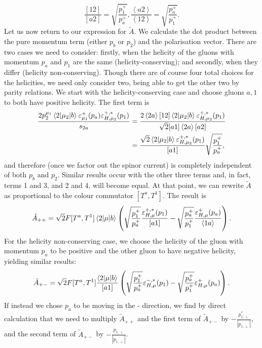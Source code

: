\begin{subequations}
\begin{equation}
\frac{[12]}{[a2]} = \sqrt{\frac{p_1^+}{p_a^+}},
\end{equation}
\begin{equation}
\frac{\left<a2\right>}{\left<12\right>} = \sqrt{\frac{p_a^+}{p_1^+}}.
\end{equation}
\end{subequations}
Let us now return to our expression for $\tilde{A}$. We calculate the dot product between the pure momentum term (either $p_b$ or $p_2$) and the polarisation vector. There are two cases we need to consider: firstly, when the helicity of the gluons with momentum $p_a$ and $p_1$ are the same (helicity-conserving); and secondly, when they differ (helicity non-conserving). Though there are of course four total choices for the helicities, we need only consider two, being able to get the other two by parity relations. We start with the helicity-conserving case and choose gluons $a,1$ to both have positive helicity. The first term is 
\begin{equation}
\begin{split}
 \frac{2 p_2^{\mu_1} \mathinner{\langle2\vert\mu_2\vert b\rangle}_{} \varepsilon_{\mu_1}^+ (p_a) \varepsilon_{H,\mu_2}^{+,*}(p_1)}{s_{2a}} &= \frac{2 \left<2 a \right> [1 2] \mathinner{\langle2\vert\mu_2\vert b\rangle}_{}\varepsilon_{H,\mu_2}^{+,*}(p_1)}{\sqrt{2}[a 1] \left<2 a \right> [a 2]} \\
 &= \frac{\sqrt{2}\mathinner{\langle2\vert\mu_2\vert b\rangle}_{}\varepsilon_{H,\mu_2}^{+,*}(p_1)}{[a1]} \sqrt{\frac{p_1^+}{p_a^+}},
 \end{split}
\end{equation}
and therefore (once we factor out the spinor current) is completely independent of both $p_b$ and $p_2$. Similar results occur with the other three terms and, in fact, terms 1 and 3, and 2 and 4, will become equal. At that point, we can rewrite $\tilde{A}$ as proportional to the colour commutator $[T^a,T^1]$. The result is
\begin{equation}
\tilde{A}_{++} = \sqrt{2} F [T^a,T^1] \mathinner{\langle2\vert\mu\vert b\rangle}_{} \left(\sqrt{\frac{p_1^+}{p_a^+}}\frac{\varepsilon_{H,\mu}^{+,*}(p_1)}{[a1]} - \sqrt{\frac{p_a^+}{p_1^+}}\frac{\varepsilon_{H,\mu}^{+}(p_a)}{ \left<1 a \right>} \right).
\end{equation}
For the helicity non-conserving case, we choose the helicity of the gluon with momentum $p_a$ to be positive and the other gluon to have negative helicity, yielding similar results:
\begin{equation}
\tilde{A}_{+-} = \sqrt{2} F [T^a,T^1] \frac{\mathinner{\langle2\vert\mu\vert b\rangle}_{}}{[a1]} \left(\sqrt{\frac{p_1^+}{p_a^+}}\varepsilon_{H,\mu}^{-,*}(p_1) - \sqrt{\frac{p_a^+}{p_1^+}}\varepsilon_{H,\mu}^{+}(p_a) \right).
\end{equation}
If instead we chose $p_a$ to be moving in the - direction, we find by direct calculation that we need to multiply $\tilde{A}_{++}$ and the first term of $\tilde{A}_{+-}$ by $-\frac{p_{1,\perp}^*}{|p_{1,\perp}|}$, and the second term of $\tilde{A}_{+-}$ by $-\frac{p_{1,\perp}}{|p_{1,\perp}|}$. 

